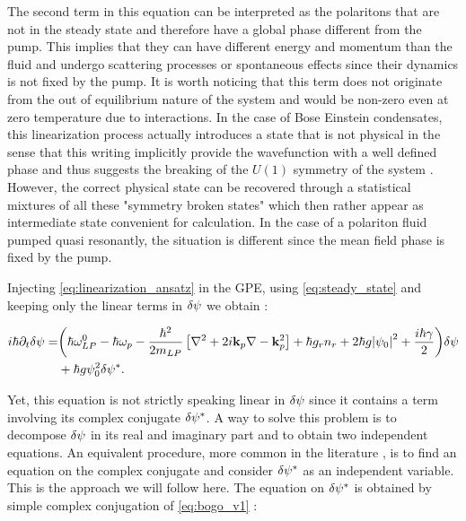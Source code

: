 The second term in this equation can be interpreted as the polaritons that are not in the steady state and therefore have a global phase different from the pump. 
This implies that they can have different energy and momentum than the fluid and undergo scattering processes or spontaneous effects since their dynamics is not fixed by the pump. It is 
worth noticing that this term does not originate from the out of equilibrium nature of the system and would be non-zero even at zero temperature due to interactions.
In the case of Bose Einstein condensates, this linearization process actually introduces a state that is not physical in the sense that this writing implicitly provide the wavefunction with a well defined phase and thus suggests the breaking of the $U(1)$ symmetry of the system \cite{castin_bose-einstein_2001}. However, the correct physical state can be recovered through a statistical mixtures of all these "symmetry broken states" which then rather appear 
as intermediate state convenient for calculation. In the case of a polariton fluid pumped quasi resonantly, the situation is different since the mean field phase 
is fixed by the pump. 

\bigskip

Injecting \autoref{eq:linearization_ansatz} in the GPE, using \autoref{eq:steady_state} and keeping only the linear terms in $\delta\psi$ we obtain :

\begin{equation}
    \begin{split}
        i  \hbar \partial_t \delta\psi =& \biggl(\hbar\omega_{LP}^0 - \hbar \omega_p-\dfrac{\hbar^2}{2m_{LP}}\left[\nabla^2 +2i\mathbf{k}_p\nabla-\mathbf{k}_p^2\right]+\hbar g_rn_r + 2\hbar g \abs{\psi_0}^2+ \dfrac{i\hbar\gamma}{2} \biggr) \delta\psi \\
                                    &+ \hbar g \psi_0^2 \delta\psi^*. 
    \end{split}
    \label{eq:bogo_v1}
\end{equation}

Yet, this equation is not strictly speaking linear in $\delta\psi$ since it contains a term involving its complex conjugate $\delta\psi^*$. A way to solve this problem
is to decompose $\delta\psi$ in its real and imaginary part and to obtain two independent equations. An equivalent procedure, more common in the literature \cite{pethick_bose-einstein_2008}, is to find an equation on 
the complex conjugate and consider $\delta\psi^*$ as an independent variable. This is the approach we will follow here. The equation on $\delta\psi^*$ is obtained by simple complex conjugation of \autoref{eq:bogo_v1} :

